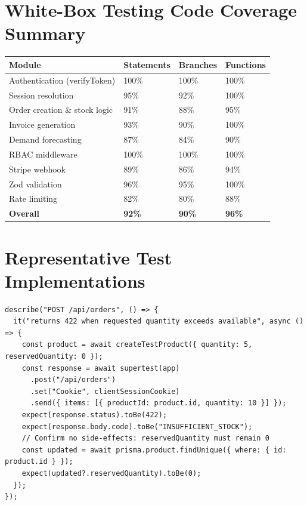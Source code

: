 \documentclass[12pt,a4paper]{report}
\begin{document}
\section{White-Box Testing Code Coverage Summary}

\begin{center}
\begin{tabularx}{\textwidth}{lXXX}
    \toprule
    \textbf{Module} & \textbf{Statements} & \textbf{Branches} & \textbf{Functions} \\
    \midrule
    Authentication (verifyToken) & 100\% & 100\% & 100\% \\
    Session resolution & 95\% & 92\% & 100\% \\
    Order creation \& stock logic & 91\% & 88\% & 95\% \\
    Invoice generation & 93\% & 90\% & 100\% \\
    Demand forecasting & 87\% & 84\% & 90\% \\
    RBAC middleware & 100\% & 100\% & 100\% \\
    Stripe webhook & 89\% & 86\% & 94\% \\
    Zod validation & 96\% & 95\% & 100\% \\
    Rate limiting & 82\% & 80\% & 88\% \\
    \midrule
    \textbf{Overall} & \textbf{92\%} & \textbf{90\%} & \textbf{96\%} \\
    \bottomrule
\end{tabularx}
\end{center}

\section{Representative Test Implementations}

\begin{lstlisting}[caption={Integration test --- order creation with insufficient stock}]
describe("POST /api/orders", () => {
  it("returns 422 when requested quantity exceeds available", async () => {
    const product = await createTestProduct({ quantity: 5, reservedQuantity: 0 });
    const response = await supertest(app)
      .post("/api/orders")
      .set("Cookie", clientSessionCookie)
      .send({ items: [{ productId: product.id, quantity: 10 }] });
    expect(response.status).toBe(422);
    expect(response.body.code).toBe("INSUFFICIENT_STOCK");
    // Confirm no side-effects: reservedQuantity must remain 0
    const updated = await prisma.product.findUnique({ where: { id: product.id } });
    expect(updated?.reservedQuantity).toBe(0);
  });
});
\end{lstlisting}
\end{document}
